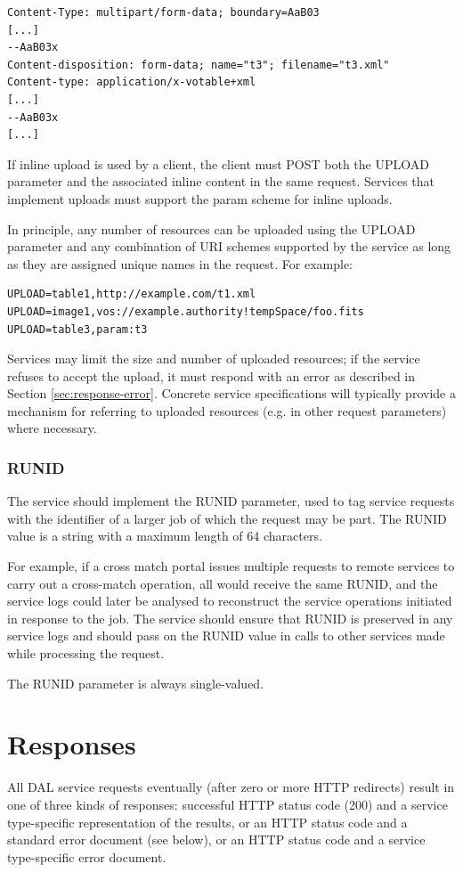 \documentclass[11pt,letter]{ivoa}
\begin{document}
\begin{verbatim}
Content-Type: multipart/form-data; boundary=AaB03
[...]
--AaB03x
Content-disposition: form-data; name="t3"; filename="t3.xml"
Content-type: application/x-votable+xml
[...]
--AaB03x
[...]
\end{verbatim}

If inline upload is used by a client, the client must POST both the UPLOAD
parameter and the associated inline content in the same request. Services that
implement uploads must support the param scheme for inline uploads.

In principle, any number of resources can be uploaded using the UPLOAD parameter
and any combination of URI schemes supported by the service as long as they are
assigned unique names in the request. For example:

\begin{verbatim}
UPLOAD=table1,http://example.com/t1.xml
UPLOAD=image1,vos://example.authority!tempSpace/foo.fits
UPLOAD=table3,param:t3
\end{verbatim}

Services may limit the size and number of uploaded resources; if the service
refuses to accept the upload, it must respond with an error as described in
Section \ref{sec:response-error}. Concrete service specifications will
typically provide a mechanism for referring to uploaded resources (e.g. in
other request parameters) where necessary.

\subsubsection{RUNID}
\label{sec:RUNID}
The service should implement the RUNID parameter, used to tag service requests
with the identifier of a larger job of which the request may be part. The RUNID
value is a string with a maximum length of 64 characters.

For example, if a cross match portal issues multiple requests to remote services
to carry out a cross-match operation, all would receive the same RUNID, and the
service logs could later be analysed to reconstruct the service operations
initiated in response to the job. The service should ensure that RUNID is
preserved in any service logs and  should pass on the RUNID value in calls to
other services made while processing the request.

The RUNID parameter is always single-valued.

\section{Responses}
\label{sec:responses}
All DAL service requests eventually (after zero or more HTTP redirects) result
in one of three kinds of responses:
successful HTTP status code (200) and a service type-specific
representation of the results, or an HTTP status code and a standard error
document (see below), or an HTTP status code and a service type-specific
error document.
\end{document}
